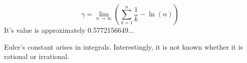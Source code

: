 \[ 
  \gamma = \lim _{n \to \infty}
  \left ( \sum_{k=1} ^{n} 
  \frac{1}{k} - \ln(n) \right ) \]
It's value is approximately 0.5772156649...
\par
Euler's constant arises in integrals. Interestingly, it is not known whether it is rational or irrational.